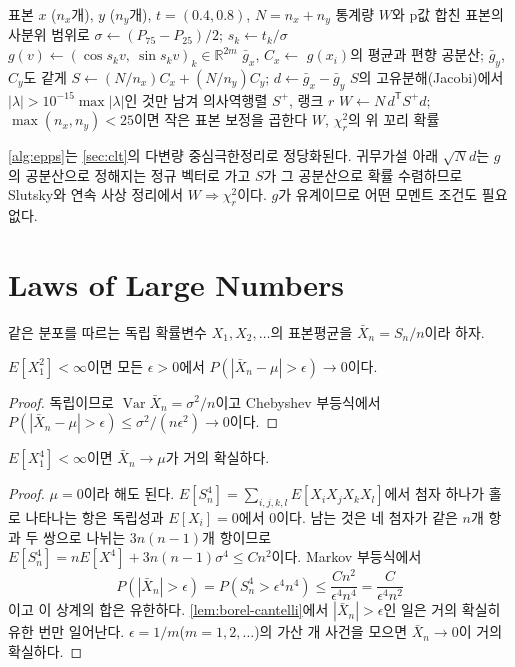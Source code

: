 \begin{algorithm}[htbp]
\begin{algorithmic}[1]
\Require 표본 $x$ ($n_x$개), $y$ ($n_y$개), $t=(0.4,0.8)$, $N=n_x+n_y$
\Ensure 통계량 $W$와 p값
\State 합친 표본의 사분위 범위로 $\sigma\gets(P_{75}-P_{25})/2$; $s_k\gets t_k/\sigma$
\State $g(v)\gets(\cos s_kv,\ \sin s_kv)_k\in\mathbb R^{2m}$
\State $\bar g_x$, $C_x\gets$ $g(x_i)$의 평균과 편향 공분산; $\bar g_y$, $C_y$도 같게
\State $S\gets(N/n_x)C_x+(N/n_y)C_y$; $d\gets\bar g_x-\bar g_y$
\State $S$의 고유분해(Jacobi)에서 $|\lambda|>10^{-15}\max|\lambda|$인 것만 남겨 의사역행렬 $S^+$, 랭크 $r$
\State $W\gets N\,d^{\mathsf T}S^+d$; $\max(n_x,n_y)<25$이면 작은 표본 보정을 곱한다
\State \Return $W$, $\chi^2_r$의 위 꼬리 확률
\end{algorithmic}
\caption{Epps--Singleton 검정 (stardust )}
\label{alg:epps}
\end{algorithm}

\cref{alg:epps}는 \cref{sec:clt}의 다변량 중심극한정리로 정당화된다. 귀무가설 아래 $\sqrt N d$는 $g$의 공분산으로 정해지는 정규 벡터로 가고 $S$가 그 공분산으로 확률 수렴하므로 Slutsky와 연속 사상 정리에서 $W\Rightarrow\chi^2_r$이다. $g$가 유계이므로 어떤 모멘트 조건도 필요 없다.

\section{Laws of Large Numbers}
\label{sec:lln}

같은 분포를 따르는 독립 확률변수 $X_1,X_2,\dots$의 표본평균을 $\bar X_n=S_n/n$이라 하자.

\begin{theorem}[약한 법칙]
\label{thm:wlln}
$E[X_1^2]<\infty$이면 모든 $\epsilon>0$에서 $P(|\bar X_n-\mu|>\epsilon)\to0$이다.
\end{theorem}

\begin{proof}
독립이므로 $\operatorname{Var}\bar X_n=\sigma^2/n$이고 Chebyshev 부등식에서 $P(|\bar X_n-\mu|>\epsilon)\le\sigma^2/(n\epsilon^2)\to0$이다.
\end{proof}

\begin{theorem}[강한 법칙, 4차 모멘트]
\label{thm:slln4}
$E[X_1^4]<\infty$이면 $\bar X_n\to\mu$가 거의 확실하다.
\end{theorem}

\begin{proof}
$\mu=0$이라 해도 된다. $E[S_n^4]=\sum_{i,j,k,l}E[X_iX_jX_kX_l]$에서 첨자 하나가 홀로 나타나는 항은 독립성과 $E[X_i]=0$에서 $0$이다. 남는 것은 네 첨자가 같은 $n$개 항과 두 쌍으로 나뉘는 $3n(n-1)$개 항이므로 $E[S_n^4]=nE[X^4]+3n(n-1)\sigma^4\le Cn^2$이다. Markov 부등식에서
\[
P(|\bar X_n|>\epsilon)=P(S_n^4>\epsilon^4n^4)\le\frac{Cn^2}{\epsilon^4n^4}=\frac C{\epsilon^4n^2}
\]
이고 이 상계의 합은 유한하다. \cref{lem:borel-cantelli}에서 $|\bar X_n|>\epsilon$인 일은 거의 확실히 유한 번만 일어난다. $\epsilon=1/m$($m=1,2,\dots$)의 가산 개 사건을 모으면 $\bar X_n\to0$이 거의 확실하다.
\end{proof}

